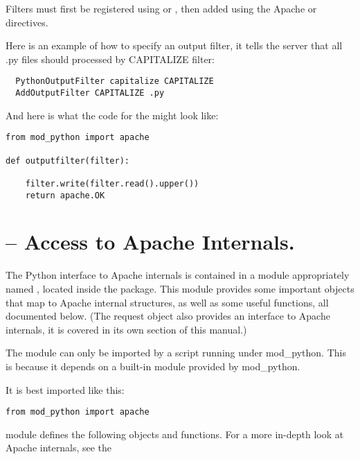 Filters must first be registered using  or
, then added using the Apache
 or  directives. 

Here is an example of how to specify an output filter, it tells the
server that all .py files should processed by CAPITALIZE filter:

\begin{verbatim}
  PythonOutputFilter capitalize CAPITALIZE
  AddOutputFilter CAPITALIZE .py
\end{verbatim}

And here is what the code for the  might look
like:

\begin{verbatim}
from mod_python import apache

def outputfilter(filter):

    filter.write(filter.read().upper())
    return apache.OK

\end{verbatim}

\section{ -- Access to Apache Internals.}

The Python interface to Apache internals is contained in a module
appropriately named , located inside the
 package. This module provides some important
objects that map to Apache internal structures, as well as some useful
functions, all documented below. (The request object also provides an
interface to Apache internals, it is covered in its own section of
this manual.)

 The  module can only be
imported by a script running under mod_python. This is because it
depends on a built-in module  provided by
mod_python.

It is best imported like this:

\begin{verbatim}
from mod_python import apache
\end{verbatim}

 module defines the following objects and
functions. For a more in-depth look at Apache internals, see the

